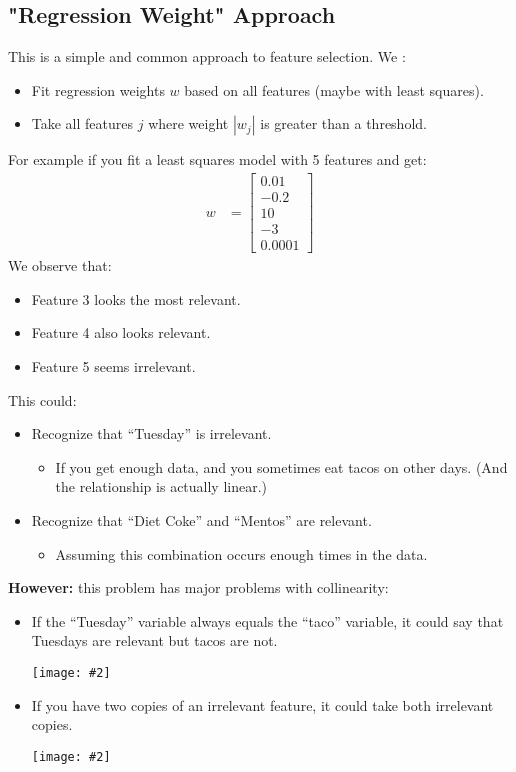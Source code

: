 \documentclass{article}
\def\blu#1{{\color{blu}#1}}
\def\red#1{{\color{red}#1}}
\theoremstyle{definition}
\newcommand{\centerfig}[2]{\begin{center}\texttt{[image: \#2]}\end{center}}
\begin{document}
\subsection*{"Regression Weight" Approach}
This is a simple and common approach to feature selection. We :
\begin{itemize}
	\item \blu{Fit regression weights $ w $ based on all features }(maybe with least squares).
	\item Take all features $ j $ where \blu{weight $ |w_j| $ is greater than a threshold.}
\end{itemize}
For example if you fit a least squares model with 5 features and get:
\begin{align*}
w &= \begin{bmatrix}
0.01 \\ -0.2 \\ 10 \\ -3 \\ 0.0001
\end{bmatrix}
\end{align*}
We observe that:
\begin{itemize}[label = -]
	\item Feature 3 looks the most relevant. 
	\item Feature 4 also looks relevant.
	\item Feature 5 seems irrelevant.
\end{itemize}
This could:
\begin{itemize}
	\item Recognize that “Tuesday” is irrelevant.
	\begin{itemize}
		\item If you get enough data, and you sometimes eat tacos on other days. (And the relationship is actually linear.)
	\end{itemize}
	\item Recognize that “Diet Coke” and “Mentos” are relevant. 
	\begin{itemize}
		\item Assuming this combination occurs enough times in the data.
	\end{itemize}
\end{itemize}
\textbf{However:} this problem has \red{major problems with collinearity}:
\begin{itemize}
	\item If the “Tuesday” variable always equals the “taco” variable, it \red{could say that Tuesdays are relevant but tacos are not.} 
	\centerfig{0.75}{reg-weight-1}
	\item If you have two copies of an irrelevant feature, \red{it could take both irrelevant copies}.
		\centerfig{0.9}{reg-weight-2}
\end{itemize}
\end{document}
